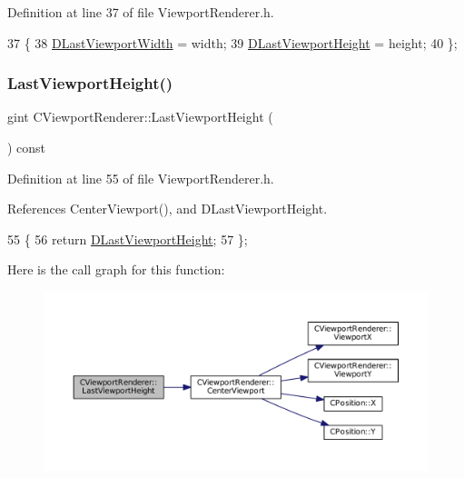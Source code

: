 Definition at line 37 of file Viewport\+Renderer.\+h.


\begin{DoxyCode}
37                                                           \{
38             \hyperlink{classCViewportRenderer_aaa21acd1b43badc3c1a3b0bf9b0f86f9}{DLastViewportWidth} = width;
39             \hyperlink{classCViewportRenderer_aaca5c330615fc2aacc57dede8e7c18b0}{DLastViewportHeight} = height;
40         \};
\end{DoxyCode}
\hypertarget{classCViewportRenderer_a55bdef4acd6335ac15f5017ad82111b3}{}\label{classCViewportRenderer_a55bdef4acd6335ac15f5017ad82111b3} 
\subsubsection{\texorpdfstring{Last\+Viewport\+Height()}{LastViewportHeight()}}
{\footnotesize\ttfamily gint C\+Viewport\+Renderer\+::\+Last\+Viewport\+Height (\begin{DoxyParamCaption}{ }\end{DoxyParamCaption}) const\hspace{0.3cm}{\ttfamily [inline]}}



Definition at line 55 of file Viewport\+Renderer.\+h.



References Center\+Viewport(), and D\+Last\+Viewport\+Height.


\begin{DoxyCode}
55                                        \{
56             \textcolor{keywordflow}{return} \hyperlink{classCViewportRenderer_aaca5c330615fc2aacc57dede8e7c18b0}{DLastViewportHeight};
57         \};
\end{DoxyCode}
Here is the call graph for this function\+:\nopagebreak
\begin{figure}[H]
\begin{center}
\leavevmode
\includegraphics[width=350pt]{classCViewportRenderer_a55bdef4acd6335ac15f5017ad82111b3_cgraph}
\end{center}
\end{figure}
\hypertarget{classCViewportRenderer_a4d87305e8c2da6933d13c9a98d80bb21}{}\label{classCViewportRenderer_a4d87305e8c2da6933d13c9a98d80bb21} 
